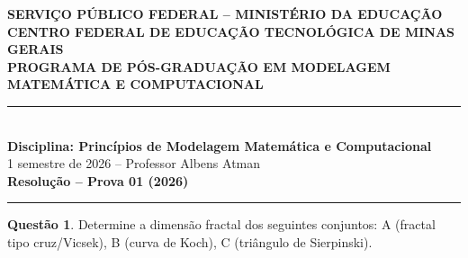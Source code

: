 \documentclass[12pt,a4paper]{article}
\theoremstyle{definition}
\newtheorem{questao}{Quest\~ao}
\begin{document}
\begin{center}
  {\large \textbf{SERVI\c{C}O P\'UBLICO FEDERAL -- MINIST\'ERIO DA EDUCA\c{C}\~AO}}\\[4pt]
  {\large \textbf{CENTRO FEDERAL DE EDUCA\c{C}\~AO TECNOL\'OGICA DE MINAS GERAIS}}\\[4pt]
  {\large \textbf{PROGRAMA DE P\'OS-GRADUA\c{C}\~AO EM MODELAGEM MATEM\'ATICA E COMPUTACIONAL}}\\[10pt]
  \rule{\linewidth}{0.4pt}\\[6pt]
  {\Large \textbf{Disciplina: Princ\'ipios de Modelagem Matem\'atica e Computacional}}\\[4pt]
  {\large 1\textordmasculine{} semestre de 2026 -- Professor Albens Atman}\\[4pt]
  {\large \textbf{Resolu\c{c}\~ao -- Prova 01 (2026)}}\\[4pt]
  \rule{\linewidth}{0.4pt}
\end{center}

\bigskip

\begin{questao}
Determine a dimens\~ao fractal dos seguintes conjuntos: A (fractal tipo cruz/Vicsek), B (curva de Koch), C (tri\^angulo de Sierpinski).
\end{questao}
\end{document}
